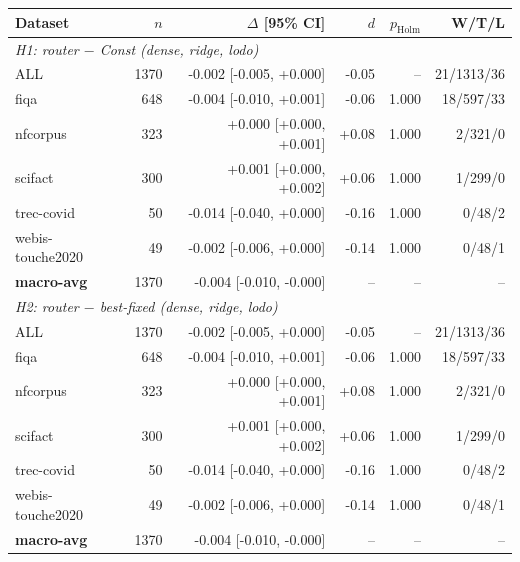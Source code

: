 \begin{tabular}{lrrrrr}
\hline
Dataset & $n$ & $\Delta$ [95\% CI] & $d$ & $p_{\mathrm{Holm}}$ & W/T/L \\
\hline
\multicolumn{6}{l}{\textit{H1: router $-$ Const (dense, ridge, lodo)}} \\
ALL & 1370 & -0.002 [-0.005, +0.000] & -0.05 & -- & 21/1313/36 \\
fiqa & 648 & -0.004 [-0.010, +0.001] & -0.06 & 1.000 & 18/597/33 \\
nfcorpus & 323 & +0.000 [+0.000, +0.001] & +0.08 & 1.000 & 2/321/0 \\
scifact & 300 & +0.001 [+0.000, +0.002] & +0.06 & 1.000 & 1/299/0 \\
trec-covid & 50 & -0.014 [-0.040, +0.000] & -0.16 & 1.000 & 0/48/2 \\
webis-touche2020 & 49 & -0.002 [-0.006, +0.000] & -0.14 & 1.000 & 0/48/1 \\
\textbf{macro-avg} & 1370 & -0.004 [-0.010, -0.000] & -- & -- & -- \\
\hline
\multicolumn{6}{l}{\textit{H2: router $-$ best-fixed (dense, ridge, lodo)}} \\
ALL & 1370 & -0.002 [-0.005, +0.000] & -0.05 & -- & 21/1313/36 \\
fiqa & 648 & -0.004 [-0.010, +0.001] & -0.06 & 1.000 & 18/597/33 \\
nfcorpus & 323 & +0.000 [+0.000, +0.001] & +0.08 & 1.000 & 2/321/0 \\
scifact & 300 & +0.001 [+0.000, +0.002] & +0.06 & 1.000 & 1/299/0 \\
trec-covid & 50 & -0.014 [-0.040, +0.000] & -0.16 & 1.000 & 0/48/2 \\
webis-touche2020 & 49 & -0.002 [-0.006, +0.000] & -0.14 & 1.000 & 0/48/1 \\
\textbf{macro-avg} & 1370 & -0.004 [-0.010, -0.000] & -- & -- & -- \\
\hline
\end{tabular}